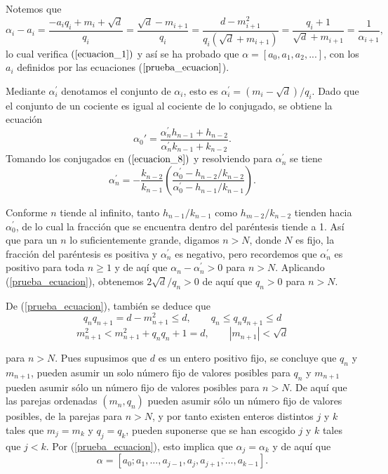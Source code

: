 \documentclass[11pt, article]{article}
\begin{document}
    Notemos que 
        \[
        \alpha_i-a_i=\dfrac{-a_iq_i+m_i+\sqrt{d}}{q_i}=\dfrac{\sqrt{d}-m_{i+1}}{q_i}=\dfrac{d-m_{i+1}^2}{q_i(\sqrt{d}+m_{i+1})}=\dfrac{q_i+1}{\sqrt{d}+m_{i+1}}=\dfrac{1}{\alpha_{i+1}},
        \]
    lo cual verifica $(\ref{ecuacion_1})$ y así se ha probado que $\alpha=[a_0,a_1,a_2,...]$, con los $a_i$ definidos por las ecuaciones ($\ref{prueba_ecuacion}$).
    
    Mediante $\alpha^{'}_{i}$ denotamos el conjunto de $\alpha_i$, esto es $\alpha^{'}_{i}=(m_i-\sqrt{d})/q_i$. Dado que el conjunto de un cociente es igual al cociente de lo conjugado, se obtiene la ecuación
        \[
        \alpha_0{'}=\dfrac{\alpha_n^{'}h_{n-1}+h_{n-2}}{\alpha_n^{'}k_{n-1}+k_{n-2}}.
        \]
    Tomando los conjugados en $(\ref{ecuacion_8})$ y resolviendo para $\alpha_n^{'}$ se tiene
        \[
        \alpha_n^{'}=-\dfrac{k_{n-2}}{k_{n-1}}\left(\dfrac{\alpha_0^{'}-h_{n-2}/k_{n-2}}{\alpha_0^{'}-h_{n-1}/k_{n-1}}\right).
        \]
        
    Conforme $n$ tiende al infinito, tanto $h_{n-1}/k_{n-1}$ como $h_{m-2}/k_{n-2}$ tienden hacia $\alpha_0^{'}$, de lo cual la fracción que se encuentra dentro del paréntesis tiende a 1. Así que para un $n$ lo suficientemente grande, digamos $n>N$, 
    donde $N$ es fijo, la fracción del paréntesis es positiva y $\alpha_n^{'}$ es negativo, pero recordemos que $\alpha_n^{'}$ es positivo para toda
    $n\geq 1$ y de aqí que $\alpha_n - \alpha_n^{'}>0$ para $n>N$. Aplicando (\ref{prueba_ecuacion}), obtenemos $2 \sqrt{d}/q_{n} >0$
    de aquí que $q_n>0$ para $n>N$.
    
    De (\ref{prueba_ecuacion}), también se deduce que 
        \[
        q_nq_{n+1}=d-m^2_{n+1}\leq d, \qquad q_n\leq q_nq_{n+1}\leq d 
        \]
        \[
        m^2_{n+1} < m_{n+1}^2+q_n q_n+1=d, \qquad |m_{n+1}|<\sqrt{d}
        \]
        
    para $n>N$. Pues supusimos que $d$ es un entero positivo fijo, se concluye que $q_n$ y $m_{n+1}$, pueden asumir un solo número fijo de valores posibles para $q_n$ y $m_{n+1}$ pueden asumir sólo un número fijo de valores posibles para $n>N$. De aquí que las parejas ordenadas $(m_n,q_n)$ pueden asumir sólo un número fijo de valores posibles, de la parejas para $n>N$, y por tanto existen enteros distintos $j$ y $k$ tales que $m_j=m_k$ y $q_j=q_k$, pueden suponerse que se han escogido $j$ y $k$ tales que $j<k$. Por (\ref{prueba_ecuacion}), esto implica que $\alpha_j=\alpha_k$ y de aquí que
        \[
        \alpha=[a_0;a_1,...,a_{j-1},\overline{a_j,a_{j+1},...,a_{k-1}}].
        \]
\end{document}

